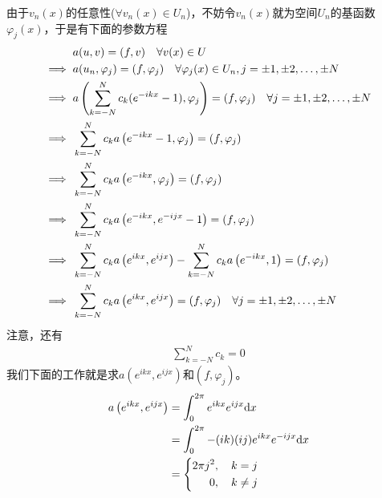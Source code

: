                 由于$v_n(x)$的任意性($\forall v_n(x) \in U_n$)，不妨令$v_n(x)$就为空间$U_n$的基函数$\varphi_j(x)$，于是有下面的参数方程
                \begin{align}
                    \label{参数方程}
                               &a(u,v) = (f,v) \quad \forall v(x)\in  U \notag\\
                    \implies {}&a(u_n,\varphi_j) = (f,\varphi_j)
                    \quad \forall \varphi_j(x) \in U_n ,j = \pm 1, \pm 2,\dots,\pm N \notag\\
                    \implies {}&a\left(\sum_{k = -N}^{N} c_k (e^{-ikx} -1 ),\varphi_j\right) = (f,\varphi_j)
                    \quad \forall j = \pm 1, \pm 2,\dots,\pm N \notag\\
                    \implies {}&\sum_{k = -N}^N c_k a\left( e^{-ikx} -1,\varphi_j \right)= (f,\varphi_j)
                    \notag\\
                    \implies {}&\sum_{k = -N}^N c_k a\left( e^{-ikx},\varphi_j \right)= (f,\varphi_j)
                    \notag\\
                    \implies {}&\sum_{k = -N}^N c_k a\left( e^{-ikx},e^{-ijx} -1 \right)= (f,\varphi_j)
                    \notag\\
                    \implies {}&\sum_{k = -N}^N c_k a\left( e^{ikx},e^{ijx} \right) - \sum_{k = -N}^N c_k a\left( e^{-ikx},1 \right)= (f,\varphi_j) \notag \\
                    \implies {}&\sum_{k = -N}^N c_k a\left( e^{ikx},e^{ijx} \right) = (f,\varphi_j)
                    \quad \forall j = \pm 1, \pm 2,\dots,\pm N
                \end{align}
                注意，还有
                \begin{align*}
                    \sum_{k = -N}^N c_k = 0
                \end{align*}
                我们下面的工作就是求$ a\left( e^{ikx},e^{ijx} \right)$和$(f,\varphi_j) $。
                \begin{align}
                    \label{参数方程子式}
                    a\left( e^{ikx},e^{ijx} \right) &= \int_0^{2\pi} e^{ikx} e^{ijx}\mathrm{d}x \notag \\
                    & = \int_0^{2\pi} -(ik)(ij) e^{ikx} e^{-ijx}\mathrm{d}x \notag \\
                    & =
                    \left\{
                    \begin{aligned}
                        2\pi j^2,\quad k = j \\
                        0,\quad k \neq j \\
                    \end{aligned}
                    \right.
                \end{align}
